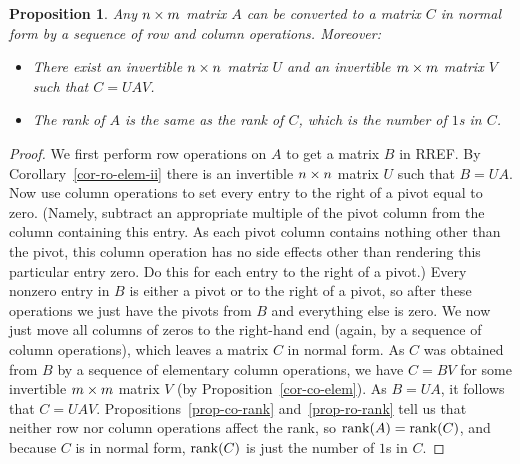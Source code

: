 \documentclass[reqno]{amsart}
\newtheorem{proposition}[theorem]{Proposition}
\theoremstyle{definition}
\begin{document}
\begin{proposition}\label{prop-normal-form}
 Any $n\times m$ matrix $A$ can be converted to a matrix $C$ in normal
 form by a sequence of row and column operations.  Moreover:
 \begin{itemize}
  \item[(a)] There exist an invertible $n\times n$ matrix $U$ and an
   invertible $m\times m$ matrix $V$ such that $C=UAV$.
  \item[(b)] The rank of $A$ is the same as the rank of $C$, which is
   the number of $1$s in $C$.
 \end{itemize}
\end{proposition}
\begin{proof}
 We first perform row operations on $A$ to get a matrix $B$ in RREF.  By
 Corollary~\ref{cor-ro-elem-ii} there is an invertible $n\times n$ matrix
 $U$ such that $B=UA$.
 Now use column operations to set every entry to the right
 of a pivot equal to zero.
 (Namely, subtract an appropriate multiple of the pivot column
 from the column containing this entry.
 As each pivot column contains nothing other than the pivot,
 this column operation has no side effects other than rendering
 this particular entry zero.  Do this for each entry to the right of
 a pivot.)
 Every nonzero entry in $B$ is either a pivot or to the right of a
 pivot, so after these operations we just have the pivots from $B$ and
 everything else is zero.  We now just move all columns of zeros to
 the right-hand end (again, by a sequence of column operations),
 which leaves a matrix $C$ in normal form.  As $C$
 was obtained from $B$ by a sequence of elementary column operations,
 we have $C=BV$ for some invertible $m\times m$ matrix $V$
 (by Proposition~\ref{cor-co-elem}).  As $B=UA$,
 it follows that $C=UAV$.  Propositions~\ref{prop-co-rank}
 and~\ref{prop-ro-rank} tell us that neither row nor column operations
 affect the rank, so $\operatorname{rank}(A)=\operatorname{rank}(C)$, and because $C$ is in normal
 form, $\operatorname{rank}(C)$ is just the number of $1$s in $C$.
\end{proof}
\end{document}
